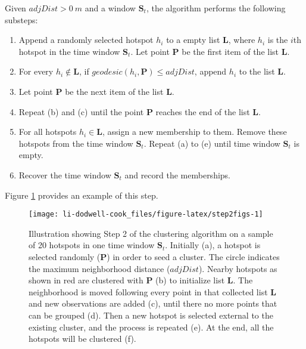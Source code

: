 Given \(adjDist>0~m\) and a window \(\boldsymbol{S}_t\), the algorithm performs the following substeps:

\begin{enumerate}
\def\labelenumi{(\alph{enumi})}
\item
  Append a randomly selected hotspot \(h_i\) to a empty list \(\boldsymbol{L}\), where \(h_i\) is the \(i\)th hotspot in the time window \(\boldsymbol{S}_t\). Let point \(\boldsymbol{P}\) be the first item of the list \(\boldsymbol{L}\).
\item
  For every \(h_i \notin \boldsymbol{L}\), if \(geodesic(h_i, \boldsymbol{P})\leq adjDist\), append \(h_i\) to the list \(\boldsymbol{L}\).
\item
  Let point \(\boldsymbol{P}\) be the next item of the list \(\boldsymbol{L}\).
\item
  Repeat (b) and (c) until the point \(\boldsymbol{P}\) reaches the end of the list \(\boldsymbol{L}\).
\item
  For all hotspots \(h_i \in \boldsymbol{L}\), assign a new membership to them. Remove these hotspots from the time window \(\boldsymbol{S}_t\). Repeat (a) to (e) until time window \(\boldsymbol{S}_t\) is empty.
\item
  Recover the time window \(\boldsymbol{S}_t\) and record the memberships.
\end{enumerate}

\noindent Figure \ref{fig:step2figs} provides an example of this step.

\begin{figure}

{\centering \texttt{[image: li-dodwell-cook\_files/figure-latex/step2figs-1]} 

}

\caption{Illustration showing Step 2 of the clustering algorithm on a sample of 20 hotspots in one time window $\boldsymbol{S}_t$. Initially (a), a hotspot is selected randomly ($\boldsymbol{P}$) in order to seed a cluster. The circle indicates the maximum neighborhood distance ($adjDist$). Nearby hotspots as shown in red are clustered with $\boldsymbol{P}$ (b) to initialize list $\boldsymbol{L}$. The neighborhood is moved following every point in that collected list $\boldsymbol{L}$ and new observations are added (c), until there no more points that can be grouped (d). Then a new hotspot is selected external to the existing cluster, and the process is repeated (e). At the end, all the hotspots will be clustered (f).}\label{fig:step2figs}
\end{figure}

